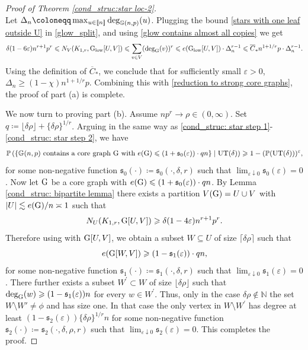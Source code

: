 \documentclass[a4paper,11pt,english,reqno]{amsart}
\numberwithin{equation}{section}
\renewcommand{\leq}{\leqslant}
\renewcommand{\geq}{\geqslant}
\newcommand{\cstar}{\overline{C}_{*}}
\newcommand{\N}{\mathbb{N}}
\newcommand{\UT}{\textup{UT}(\delta)}
\renewcommand{\P}{\mathbb{P}}
\newcommand{\G}{\mathbb{G}}
\newcommand{\glow}{\textup{G}_{\textup{low}}}
\newcommand{\tu}[1]{\textup{#1}}
\newcommand{\set}[1]{[\![#1]\!]}
\begin{document}
\begin{proof}[Proof of Theorem \ref{cond_struc:star loc-2}]
\begin{equation}
		\end{equation}
		Let $\Delta_{n}\coloneqq \max_{u\in \set{n}}\tu{deg}_{\G(n,p)}(u)$.  Plugging the bound \eqref{stars with one leaf outside U} in \eqref{glow_split}, and using \eqref{glow contains almost all copies} we get
		\begin{equation*}
			\delta(1-6\varepsilon)n^{r+1}p^{r} \leq N_{V}(K_{1,r}, \glow[U,V]) \leq \sum_{v\in V} (\tu{deg}_{\tu{G}}(v))^{r}\leq e(\glow[U,V])\cdot \Delta_{n}^{r-1}\leq \cstar n^{1+1/r}p \cdot \Delta_{n}^{r-1}.
		\end{equation*}
		Using the definition of $\cstar$, we conclude that for sufficiently small $\varepsilon>0$, $\Delta_{n}\geq (1-\chi)n^{1+1/r}p$. Combining this with \eqref{reduction to strong core graphs}, the proof of part (a) is complete.
		
		
		We now turn to proving part (b). Assume $np^{r}\rightarrow \rho\in (0,\infty)$. Set $q\coloneqq \lfloor \delta \rho\rfloor + \{\delta\rho\}^{1/r}$.
		Arguing in the same way as \eqref{cond_struc: star step 1}-\eqref{cond_struc: star step 2}, we have
		\begin{equation*}
			\P\left(\left\{ \G(n,p)\tu{ contains a core graph G with }e(\tu{G})\leq (1+\mathfrak{s}_{0}(\varepsilon))\cdot qn\right\}\mid \UT\right)\geq 1-(\P(\UT))^\varepsilon,
		\end{equation*}
		for some non-negative function $\mathfrak{s}_{0}(\cdot)\coloneqq \mathfrak{s}_{0}(\cdot, \delta, r)$ such that $\lim_{\varepsilon\downarrow 0}\mathfrak{s}_{0}(\varepsilon)=0$. Now let $\tu{G}$ be a core graph with $e(\tu{G})\leq (1+\mathfrak{s}_0(\varepsilon))\cdot qn$.
		By Lemma \ref{cond_struc: bipartite lemma} there exists a partition $V(\tu{G})=U\cup V$ with $|U|\lesssim e(\tu{G})/n \asymp 1$ such that 
		\begin{equation*}
			N_{U}(K_{1,r}, \tu{G}[U,V])\geq \delta(1-4\varepsilon)n^{r+1}p^{r}.
		\end{equation*}
		Therefore using \cite[Lemma~5.14(ii)]{HMS} with $\tu{G}[U,V]$, we obtain a subset $W\subseteq U$ of size $\lceil \delta \rho\rceil$ such that 
		\begin{equation*}
			e(\tu{G}[W, V])\geq (1-\mathfrak{s}_{1}(\varepsilon))\cdot qn,
		\end{equation*}
		for some non-negative function $\mathfrak{s}_{1}(\cdot)\coloneqq \mathfrak{s}_{1}(\cdot, \delta, r)$ such that $\lim_{\varepsilon\downarrow 0}\mathfrak{s}_{1}(\varepsilon)= 0$. There further exists a subset $W^{'}\subset W$ of size $\lfloor \delta \rho\rfloor$ such that $\tu{deg}_{\tu{G}}(w)\geq (1-\mathfrak{s}_{1}(\varepsilon))n$ for every $w\in W^{'}$. Thus, only in the case $\delta \rho \notin \N$ the set $W\setminus W' \neq \phi$ and has size one. In that case the only vertex in $W\setminus W^{'}$ has degree at least $(1-\mathfrak{s}_{2}(\varepsilon))\{\delta\rho\}^{1/r}n$ for some non-negative function $\mathfrak{s}_{2}(\cdot)\coloneqq \mathfrak{s}_{2}(\cdot, \delta, \rho, r)$ such that $\lim_{\varepsilon\downarrow 0}\mathfrak{s}_{2}(\varepsilon)= 0$. This completes the proof.
	\end{proof}
	
\end{document}
